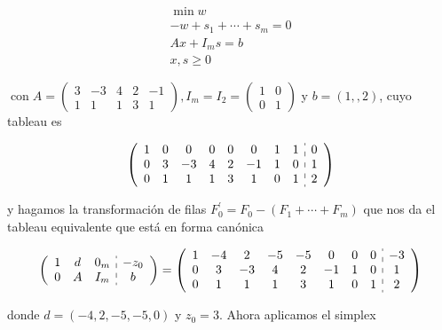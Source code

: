 \documentclass[10pt]{article}
\begin{document}
$$
\begin{gathered}
\min w \\
-w+s_{1}+\cdots+s_{m}=0 \\
A x+I_{m} s=b \\
x, s \geq 0
\end{gathered}
$$

$\operatorname{con} A=\left(\begin{array}{ccccc}3 & -3 & 4 & 2 & -1 \\ 1 & 1 & 1 & 3 & 1\end{array}\right), I_{m}=I_{2}=\left(\begin{array}{ll}1 & 0 \\ 0 & 1\end{array}\right)$ y $b=(1,, 2)$, cuyo tableau es

$$
\left(\begin{array}{cccccccc:c}
1 & 0 & 0 & 0 & 0 & 0 & 1 & 1 & 0 \\
0 & 3 & -3 & 4 & 2 & -1 & 1 & 0 & 1 \\
0 & 1 & 1 & 1 & 3 & 1 & 0 & 1 & 2
\end{array}\right)
$$

y hagamos la transformación de filas $F_{0}^{\prime}=F_{0}-\left(F_{1}+\cdots+F_{m}\right)$ que nos da el tableau equivalente que está en forma canónica

$$
\left(\begin{array}{ccc:c}
1 & d & 0_{m} & -z_{0} \\
0 & A & I_{m} & b
\end{array}\right)=\left(\begin{array}{cccccccc:c}
1 & -4 & 2 & -5 & -5 & 0 & 0 & 0 & -3 \\
0 & 3 & -3 & 4 & 2 & -1 & 1 & 0 & 1 \\
0 & 1 & 1 & 1 & 3 & 1 & 0 & 1 & 2
\end{array}\right)
$$

donde $d=(-4,2,-5,-5,0)$ y $z_{0}=3$. Ahora aplicamos el simplex
\end{document}
